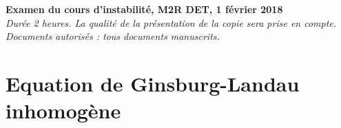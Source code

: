 \documentclass[a4paper,12pt]{article}
\begin{document}
{\Large
\noindent

\begin{center}
{\bf Examen du cours d'instabilité, M2R DET, 1 février 2018} \\
{\it \small Durée 2 heures. La qualité de la présentation de la copie sera prise en compte. 
} \\
{\it \small Documents autorisés : tous documents manuscrits.}
\end{center}
}

%
%
%
% 
%
%
%
%
%

\section{Equation de Ginsburg-Landau inhomogène}
\end{document}
